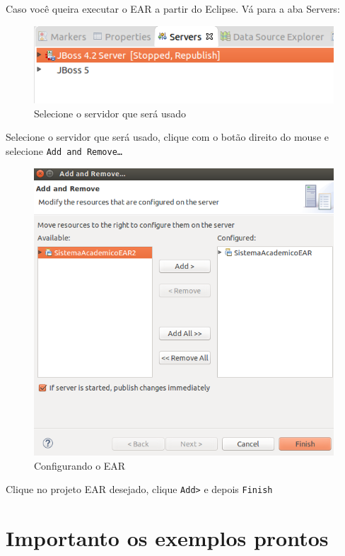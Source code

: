 Caso você queira executar o EAR a partir do Eclipse. Vá para a aba Servers:

\begin{figure}[H]
	\centering
	\includegraphics[scale=0.4]{files/imgs/gwt-11.png}
	\caption{Selecione o servidor que será usado}
	\label{gwt11}
\end{figure}

Selecione o servidor que será usado, clique com o botão direito do mouse e selecione \texttt{Add and Remove\ldots}

\begin{figure}[H]
	\centering
	\includegraphics[scale=0.4]{files/imgs/gwt-12.png}
	\caption{Configurando o EAR}
	\label{gwt12}
\end{figure}

Clique no projeto EAR desejado, clique \texttt{Add>} e depois \texttt{Finish}

\section{Importanto os exemplos prontos}

